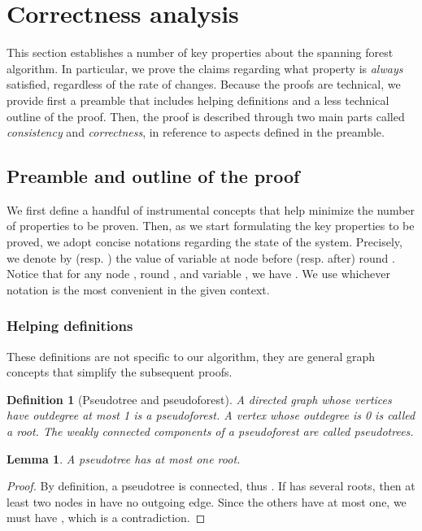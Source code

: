 \documentclass[twocolumn]{article}
\newtheorem{definition}{Definition}
\newtheorem{lemma}{Lemma}
\begin{document}
\section{Correctness analysis}
\label{sec:correctness}

This section establishes a number of key properties about the spanning forest algorithm. In particular, we prove the claims regarding what property is {\em always} satisfied, regardless of the rate of changes. Because the proofs are technical, we provide first a preamble that includes helping definitions and a less technical outline of the proof. Then, the proof is described through two main parts called {\em consistency} and {\em correctness}, in reference to aspects defined in the preamble.

\subsection{Preamble and outline of the proof}
We first define a handful of instrumental concepts that help minimize the number of properties to be proven. Then, as we start formulating the key properties to be proved, we adopt concise notations regarding the state of the system. Precisely, we denote by  (resp. ) the value of variable  at node  before (resp. after) 
round . Notice that for any node , round , and variable , we have . 
We use whichever notation is the most convenient in the given context.

\subsubsection{Helping definitions}

These definitions are not specific to our algorithm, they are general graph concepts that simplify the subsequent proofs.

\begin{definition}[Pseudotree and pseudoforest]
\label{def:pseudoforest}
A directed graph whose vertices have outdegree at most 1 is a {\em pseudoforest}.
A vertex whose outdegree is 0 is called a {\em root}.
The weakly connected components of a pseudoforest are called {\em pseudotrees}.
\end{definition}


\begin{lemma}
\label{lem:one_root}
  A pseudotree has at most one root.
\end{lemma}

\begin{proof}
   By definition, a pseudotree  is connected, thus . If  has several roots, then at least two nodes in  have no outgoing edge. Since the others have at most one, we must have , which is a contradiction.
 \end{proof}
\end{document}
